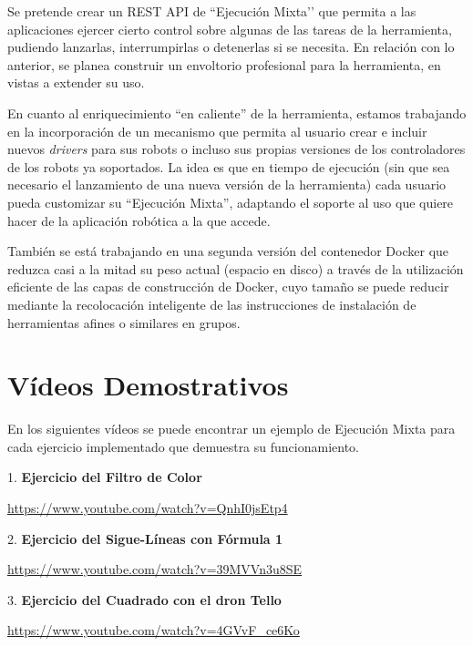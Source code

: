 Se pretende crear un REST API de ``Ejecución Mixta’’ que permita a las aplicaciones ejercer cierto control sobre algunas de las tareas de la herramienta, pudiendo lanzarlas, interrumpirlas o detenerlas si se necesita.
En relación con lo anterior, se planea construir un envoltorio profesional para la herramienta, en vistas a extender su uso.

En cuanto al enriquecimiento ``en caliente'' de la herramienta, estamos trabajando en la incorporación de un mecanismo que permita al usuario crear e incluir nuevos \textit{drivers} para sus robots o incluso sus propias versiones de los controladores de los robots ya soportados. La idea es que en tiempo de ejecución (sin que sea necesario el lanzamiento de una nueva versión de la herramienta) cada usuario pueda customizar su ``Ejecución Mixta'', adaptando el soporte al uso que quiere hacer de la aplicación robótica a la que accede.

También se está trabajando en una segunda versión del contenedor Docker que reduzca casi a la mitad su peso actual (espacio en disco) a través de la utilización eficiente de las capas de construcción de Docker, cuyo tamaño se puede reducir mediante la recolocación inteligente de las instrucciones de instalación de herramientas afines o similares en grupos.

\section{Vídeos Demostrativos}

En los siguientes vídeos se puede encontrar un ejemplo de Ejecución Mixta para cada ejercicio implementado que demuestra su funcionamiento.

1. \textbf{Ejercicio del Filtro de Color}

\url{https://www.youtube.com/watch?v=QnhI0jsEtp4}

2. \textbf{Ejercicio del Sigue-Líneas con Fórmula 1}

\url{https://www.youtube.com/watch?v=39MVVn3u8SE}

3. \textbf{Ejercicio del Cuadrado con el dron Tello}

\url{https://www.youtube.com/watch?v=4GVvF_ce6Ko}
